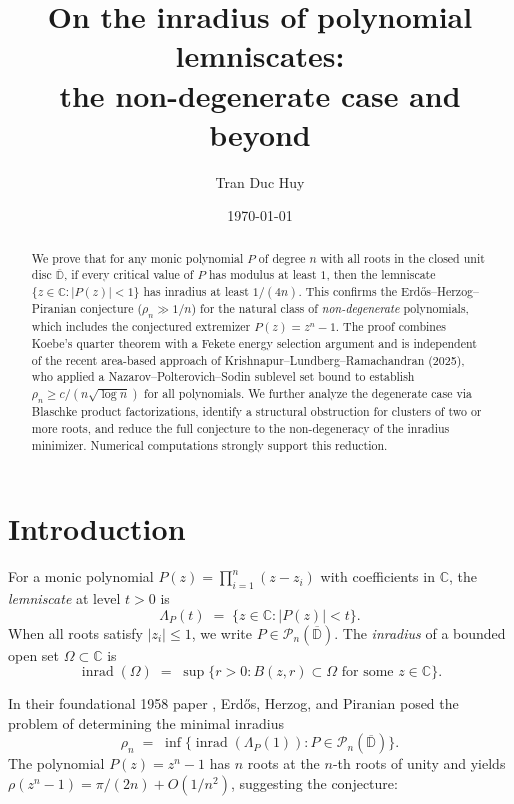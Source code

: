 \documentclass[11pt,a4paper]{amsart}
\title[Inradius of polynomial lemniscates]{On the inradius of polynomial lemniscates: \\
the non-degenerate case and beyond}
\author{Tran Duc Huy}
\date{\today}
\theoremstyle{definition}
\newcommand{\D}{\mathbb{D}}
\newcommand{\C}{\mathbb{C}}
\newcommand{\Pn}{\mathcal{P}_n}
\newcommand{\abs}[1]{\lvert #1 \rvert}
\newcommand{\inrad}{\operatorname{inrad}}
\begin{document}
\begin{abstract}
We prove that for any monic polynomial $P$ of degree $n$ with all roots in
the closed unit disc $\overline{\D}$, if every critical value of $P$ has
modulus at least $1$, then the lemniscate $\{z \in \C : \abs{P(z)} < 1\}$
has inradius at least $1/(4n)$.  This confirms the Erd\H{o}s--Herzog--Piranian
conjecture ($\rho_n \gg 1/n$) for the natural class of \emph{non-degenerate}
polynomials, which includes the conjectured extremizer $P(z) = z^n - 1$.
The proof combines Koebe's quarter theorem with a Fekete energy
selection argument and is independent of the recent area-based approach of
Krishnapur--Lundberg--Ramachandran (2025), who applied
a Nazarov--Polterovich--Sodin sublevel set bound to establish
$\rho_n \geq c/(n\sqrt{\log n})$ for all polynomials.
We further analyze the degenerate case via Blaschke product
factorizations, identify a structural obstruction for clusters of
two or more roots, and reduce the full conjecture to the
non-degeneracy of the inradius minimizer.
Numerical computations strongly support this reduction.
\end{abstract}

\maketitle

\section{Introduction}

For a monic polynomial $P(z) = \prod_{i=1}^n (z - z_i)$ with coefficients in $\C$,
the \emph{lemniscate} at level $t > 0$ is
\[
  \Lambda_P(t) \;=\; \bigl\{z \in \C : \abs{P(z)} < t\bigr\}.
\]
When all roots satisfy $\abs{z_i} \leq 1$, we write
$P \in \Pn(\overline{\D})$.
The \emph{inradius} of a bounded open set $\Omega \subset \C$ is
\[
  \inrad(\Omega) \;=\; \sup\bigl\{r > 0 : B(z,r) \subset \Omega
  \text{ for some } z \in \C\bigr\}.
\]

In their foundational 1958 paper \cite{EHP58}, Erd\H{o}s, Herzog, and Piranian
posed the problem of determining the minimal inradius
\[
  \rho_n \;=\; \inf\bigl\{\inrad(\Lambda_P(1)) : P \in \Pn(\overline{\D})\bigr\}.
\]
The polynomial $P(z) = z^n - 1$ has $n$ roots at the $n$-th roots of unity
and yields $\rho(z^n - 1) = \pi/(2n) + O(1/n^2)$, suggesting the conjecture:
\end{document}
